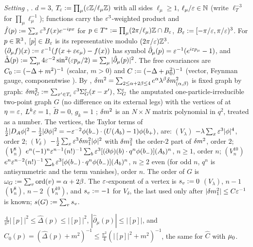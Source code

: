 \emph{Setting} \cite[pp.~605--606]{Ba1}, \cite[pp.~413, 416--417]{Ba3}. $d=3$, $T_{\varepsilon}:=\prod_\mu(\varepsilon\mathbb Z/\ell_\mu\mathbb Z)$ with all sides $\ell_\mu\ge1$, $\ell_\mu/\varepsilon\in\mathbb N$ (write $\ell_T^{-3}$ for $\prod_\mu\ell_\mu^{-1}$); functions carry the $\varepsilon^3$-weighted product and $\hat f(p):=\sum_x\varepsilon^3f(x)e^{-ipx}$ for $p\in T^*:=\prod_\mu(2\pi/\ell_\mu)\mathbb Z\cap B_{\varepsilon}$, $B_{\varepsilon}:=[-\pi/\varepsilon,\pi/\varepsilon)^3$. For $p\in\mathbb R^3$, $[p]\in B_{\varepsilon}$ is its representative modulo $(2\pi/\varepsilon)\mathbb Z^3$. $(\partial_\mu f)(x):=\varepsilon^{-1}(f(x+\varepsilon e_\mu)-f(x))$ has symbol $\hat\partial_\mu(p)=\varepsilon^{-1}(e^{i\varepsilon p_\mu}-1)$, and $\hat\Delta(p):=\sum_\mu4\varepsilon^{-2}\sin^2(\varepsilon p_\mu/2)=\sum_\mu|\hat\partial_\mu(p)|^2$. The free covariances are $C_0:=(-\Delta+m^2)^{-1}$ (scalar, $m>0$) and $C:=(-\Delta+\mu_0^2)^{-1}$ (vector, Feynman gauge, componentwise \cite[(1.11)]{Ba1}). By \cite[(1.20)--(1.21)]{Ba3}, $\delta m^2=\sum_{2\le\alpha+2\beta\le4}e^\alpha\lambda^\beta\delta m^2_{(\alpha,\beta)}$ is fixed graph by graph: $\delta m^2_G:=\sum_{x'\in T_{\varepsilon}}\varepsilon^3\Sigma^{\varepsilon}_G(x-x')$, $\Sigma^{\varepsilon}_G$ the amputated one-particle-irreducible two-point graph $G$ (no difference on its external legs) with the vertices of \cite[(1.6)--(1.8), (1.10)]{Ba3} at $\eta=\varepsilon$, $L^k\varepsilon=1$, $\tilde B=0$, $g_k=1$ \cite[(1.22)--(1.23)]{Ba3}; $\delta m^2$ is an $N\times N$ matrix polynomial in $q^2$, treated as a number. The vertices, the Taylor terms of $\frac12|D_A\phi|^2-\frac12|\partial\phi|^2=-\varepsilon^{-2}\phi(b_-)\cdot(U(A_b)-1)\phi(b_+)$, are: $(V_\lambda)$ $-\lambda\sum_x\varepsilon^3|\phi|^4$, order $2$; $(V_\delta)$ $-\frac12\sum_x\varepsilon^3\delta m^2_1|\phi|^2$ with $\delta m^2_1$ the order-$2$ part of $\delta m^2$, order $2$; $(V^8_n)$ $e^n(-1)^n\varepsilon^{n-1}(n!)^{-1}\sum_b\varepsilon^3[(\partial\phi)(b)\cdot q^n\phi(b_-)](A_b)^n$, $n\ge1$, order $n$; $(V^{10}_n)$ $e^n\varepsilon^{n-2}(n!)^{-1}\sum_b\varepsilon^3[\phi(b_-)\cdot q^n\phi(b_-)](A_b)^n$, $n\ge2$ even (for odd $n$, $q^n$ is antisymmetric and the term vanishes), order $n$. The order of $G$ is $\omega_G:=\sum_v\mathrm{ord}(v)=\alpha+2\beta$. The $\varepsilon$-exponent of a vertex is $s_v:=0$ $(V_\lambda)$, $n-1$ $(V^8_n)$, $n-2$ $(V^{10}_n)$, and $s_v:=-1$ for $V_\delta$, the last used only after $|\delta m^2_1|\le C\varepsilon^{-1}$ is known; $s(G):=\sum_vs_v$.

\begin{lemma}[symbols]\label{lem:a06e:M0}
$\frac4{\pi^2}|[p]|^2\le\hat\Delta(p)\le|[p]|^2$, $|\hat\partial_\mu(p)|\le|[p]|$, and $\hat C_0(p)=(\hat\Delta(p)+m^2)^{-1}\le\frac{\pi^2}4(|[p]|^2+m^2)^{-1}$, the same for $\hat C$ with $\mu_0$.
\end{lemma}

